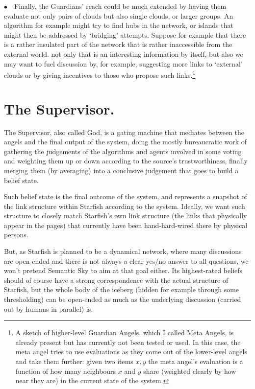\documentclass[11pt]{article}
\begin{document}
$\bullet \quad$Finally, the Guardians' reach could be much extended by having them evaluate not only pairs of clouds but also single clouds, or larger groups. An algorithm for example might try to find hubs in the network, or islands that might then be addressed by `bridging' attempts. Suppose for example that there is a rather insulated part of the network that is rather inaccessible from the external world. not only that is an interesting information by itself, but also we may want to fuel discussion by, for example, suggesting more links to `external' clouds or by giving incentives to those who propose such links.\footnote{A sketch of higher-level Guardian Angels, which I called Meta Angels, is already present but has currently not been tested or used. In this case, the meta angel tries to use evaluations as they come out of the lower-level angels and take them further: given two items $x,y$ the meta angel's evaluation is a function of how many neighbours $x$ and $y$ share (weighted clearly by how near they are) in the current state of the system.}

\section{The Supervisor.}

The Supervisor, also called God, is a gating machine that mediates between the angels and the final output of the system, doing the mostly bureaucratic work of gathering the judgements of the algorithms and agents involved in some voting and weighting them up or down according to the source's trustworthiness, finally merging them (by averaging) into a conclusive judgement that goes to build a belief state.

Such belief state is the final outcome of the system, and represents a snapshot of the link structure within Starfish according to the system. Ideally, we want such structure to closely match Starfish's own link structure (the links that physically appear in the pages) that currently have been hand-hard-wired there by physical persons.

But, as Starfish is planned to be a dynamical network, where many discussions are open-ended and there is not always a clear yes/no answer to all questions, we won't pretend Semantic Sky to aim at that goal either. Its highest-rated beliefs should of course have a strong correspondence with the actual structure of Starfish, but the whole body of the iceberg (hidden for example through some thresholding) can be open-ended as much as the underlying discussion (carried out by humans in parallel) is.
\end{document}
